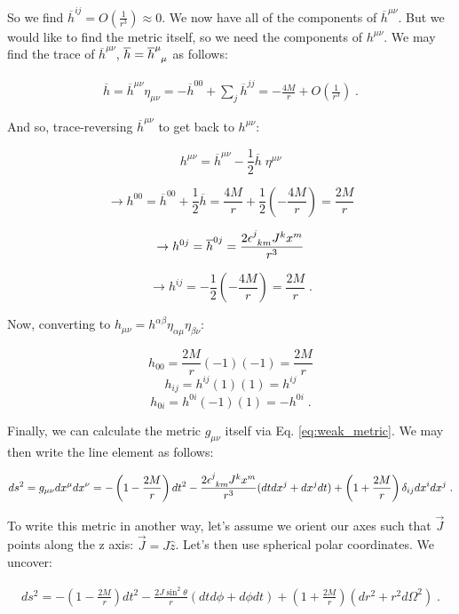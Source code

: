\documentclass[10pt]{article}
\begin{document}
So we find $\overline{h}^{ij} = O\left(\frac{1}{r^3}\right) \approx 0$. We now have all of the components of $\overline{h}^{\mu\nu}$. But we would like to find the metric itself, so we need the components of $h^{\mu\nu}$. We may find the trace of $\overline{h}^{\mu\nu}$, $\overline{h} = \tensor{\overline{h}}{^\mu_\mu}$ as follows:

\begin{align}\label{htrace}
\overline{h} = \overline{h}^{\mu\nu} \eta_{\mu\nu} = -\overline{h}^{00} + \sum_j \overline{h}^{jj} = -\frac{4M}{r} + O\left(\frac{1}{r^3}\right) \; .
\end{align}

And so, trace-reversing $\overline{h}^{\mu\nu}$ to get back to $h^{\mu\nu}$:

\[ h^{\mu\nu} = \overline{h}^{\mu\nu} - \frac{1}{2} \overline{h} \;  \eta^{\mu\nu} \]

\[ \rightarrow h^{00} = \overline{h}^{00} + \frac{1}{2} \overline{h} = \frac{4M}{r} + \frac{1}{2}\left( - \frac{4M}{r}\right) = \frac{2M}{r}\]

\[ \rightarrow h^{0j} = \overline{h}^{0j} = \frac{2\tensor{\epsilon}{^j_k_m} J^k x^m}{r^3}\]

\[ \rightarrow h^{ij} = - \frac{1}{2}\left( - \frac{4M}{r}\right) = \frac{2M}{r} \; .\]

Now, converting to $h_{\mu\nu} = h^{\alpha\beta} \eta_{\alpha\mu} \eta_{\beta\nu}$:

\[ h_{00} = \frac{2M}{r}(-1)(-1) = \frac{2M}{r}\]
\[ h_{ij} = h^{ij}(1)(1) = h^{ij} \]
\[ h_{0i} = h^{0i}(-1)(1) = -h^{0i} \; .\]

Finally, we can calculate the metric $g_{\mu\nu}$ itself via Eq. \ref{eq:weak_metric}. We may then write the line element as follows:

\begin{align}\label{lineElement}
ds^2 = g_{\mu\nu} dx^\mu dx^\nu = -\left( 1-\frac{2M}{r} \right) dt^2 - \frac{2\tensor{\epsilon}{^j_k_m} J^k x^m}{r^3}(dtdx^j + dx^j dt) + \left( 1 + \frac{2M}{r} \right) \delta_{ij} dx^i dx^j \; .
\end{align}

To write this metric in another way, let's assume we orient our axes such that $\vec{J}$ points along the z axis: $\vec{J} = J\hat{z}$. Let's then use spherical polar coordinates. We uncover:

\begin{align}\label{eq:lineElementSpherical}
ds^2 = -\left( 1-\frac{2M}{r} \right) dt^2 - \frac{2J \sin^2{\theta}}{r}(dt d\phi + d\phi dt) + \left( 1 + \frac{2M}{r} \right)(dr^2 + r^2 d\Omega^2) \; .
\end{align}
\end{document}
